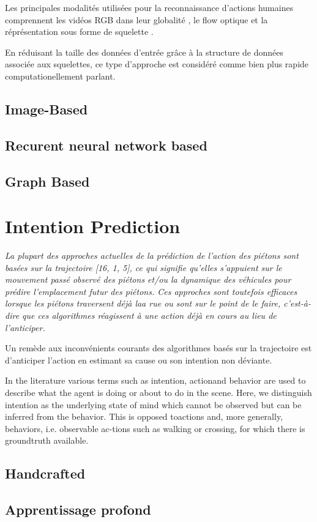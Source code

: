 Les principales modalités utilisées pour la reconnaissance d'actions humaines comprennent les vidéos RGB dans leur globalité \cite{donahue2015long,2014arXiv1412.0767T,varol2017long,Wu_2018_CVPR}, le flow optique \cite{simonyan2014two,zhang2016real,sevilla2018integration,DanutPOP} et la réprésentation sous forme de squelette \cite{vemulapalli2014human,du2015hierarchical,2016arXiv160707043L,2018arXiv180107455Y}.

En réduisant la taille des données d'entrée grâce à la structure de données associée aux squelettes, ce type d'approche est considéré comme bien plus rapide computationellement parlant.

\label{subsec:HAR}

\subsection{Image-Based}
\subsection{Recurent neural network based}
\subsection{Graph Based}

\section{Intention Prediction}
\textit{La plupart des approches actuelles de la prédiction de l'action des piétons sont basées sur la trajectoire [16, 1, 5], ce qui signifie qu'elles s'appuient sur le mouvement passé observé des piétons et/ou la dynamique des véhicules pour prédire l'emplacement futur des piétons. Ces approches sont toutefois efficaces lorsque les piétons traversent déjà laa rue ou sont sur le point de le faire, c'est-à-dire que ces algorithmes réagissent à une action déjà en cours au lieu de l'anticiper.}

Un remède aux inconvénients courants des algorithmes basés sur la trajectoire est d'anticiper l'action en estimant sa cause ou son intention non déviante.


In the literature various terms such as intention, actionand behavior are used to describe what the agent is doing or about to do in the scene. Here, we distinguish intention as the underlying state of mind which cannot be observed but can be inferred from the behavior. This is opposed toactions and, more generally, behaviors, i.e. observable ac-tions such as walking or crossing, for which there is groundtruth available.




\subsection{Handcrafted}
\subsection{Apprentissage profond}


